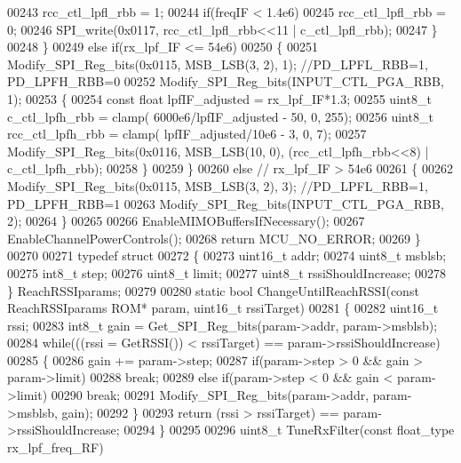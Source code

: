 \begin{DoxyCode}
00243                 rcc\_ctl\_lpfl\_rbb = 1;
00244             \textcolor{keywordflow}{if}(freqIF < 1.4e6)
00245                 rcc\_ctl\_lpfl\_rbb = 0;
00246             SPI_write(0x0117, rcc\_ctl\_lpfl\_rbb<<11 | c\_ctl\_lpfl\_rbb);
00247         \}
00248     \}
00249     \textcolor{keywordflow}{else} \textcolor{keywordflow}{if}(rx\_lpf\_IF <= 54e6)
00250     \{
00251         Modify_SPI_Reg_bits(0x0115, MSB_LSB(3, 2), 1); \textcolor{comment}{//PD\_LPFL\_RBB=1, PD\_LPFH\_RBB=0}
00252         Modify_SPI_Reg_bits(INPUT_CTL_PGA_RBB, 1);
00253         \{
00254             \textcolor{keyword}{const} \textcolor{keywordtype}{float} lpfIF\_adjusted = rx\_lpf\_IF*1.3;
00255             uint8\_t c\_ctl\_lpfh\_rbb = clamp( 6000e6/lpfIF\_adjusted - 50, 0, 255);
00256             uint8\_t rcc\_ctl\_lpfh\_rbb = clamp( lpfIF\_adjusted/10e6 - 3, 0, 7);
00257             Modify_SPI_Reg_bits(0x0116, MSB_LSB(10, 0), (rcc\_ctl\_lpfh\_rbb<<8) | c\_ctl\_lpfh\_rbb);
00258         \}
00259     \}
00260     \textcolor{keywordflow}{else} \textcolor{comment}{// rx\_lpf\_IF > 54e6}
00261     \{
00262         Modify_SPI_Reg_bits(0x0115, MSB_LSB(3, 2), 3); \textcolor{comment}{//PD\_LPFL\_RBB=1, PD\_LPFH\_RBB=1}
00263         Modify_SPI_Reg_bits(INPUT_CTL_PGA_RBB, 2);
00264     \}
00265 
00266     EnableMIMOBuffersIfNecessary();
00267     EnableChannelPowerControls();
00268     \textcolor{keywordflow}{return} MCU_NO_ERROR;
00269 \}
00270 
00271 \textcolor{keyword}{typedef} \textcolor{keyword}{struct}
00272 \{
00273     uint16\_t addr;
00274     uint8\_t msblsb;
00275     int8\_t step;
00276     uint8\_t limit;
00277     uint8\_t rssiShouldIncrease;
00278 \} ReachRSSIparams;
00279 
00280 \textcolor{keyword}{static} \textcolor{keywordtype}{bool} ChangeUntilReachRSSI(\textcolor{keyword}{const} ReachRSSIparams ROM* param, uint16\_t rssiTarget)
00281 \{
00282     uint16\_t rssi;
00283     int8\_t gain = Get_SPI_Reg_bits(param->addr, param->msblsb);
00284     \textcolor{keywordflow}{while}(((rssi = GetRSSI()) < rssiTarget) == param->rssiShouldIncrease)
00285     \{
00286         gain += param->step;
00287         \textcolor{keywordflow}{if}(param->step > 0 && gain > param->limit)
00288             \textcolor{keywordflow}{break};
00289         \textcolor{keywordflow}{else} \textcolor{keywordflow}{if}(param->step < 0 && gain < param->limit)
00290             \textcolor{keywordflow}{break};
00291         Modify_SPI_Reg_bits(param->addr, param->msblsb, gain);
00292     \}
00293     \textcolor{keywordflow}{return} (rssi > rssiTarget) == param->rssiShouldIncrease;
00294 \}
00295 
00296 uint8\_t TuneRxFilter(\textcolor{keyword}{const} float_type rx\_lpf\_freq\_RF)

\end{DoxyCode}
